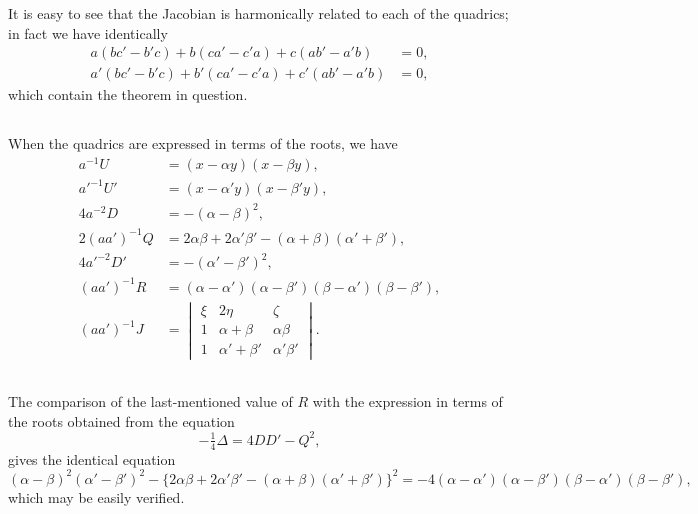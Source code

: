 \documentclass[11pt,a4paper]{book}
\begin{document}
\begin{center}
It is easy to see that the Jacobian is harmonically related to each of the quadrics; in fact we have identically
\begin{align*}
a(bc' - b'c) + b(ca' - c'a) + c(ab' - a'b) &= 0,\\
a'(bc' - b'c) + b'(ca' - c'a) + c'(ab' - a'b) &= 0,
\end{align*}
which contain the theorem in question.

\subsection{}

When the quadrics are expressed in terms of the roots, we have
\begin{align*}
a^{-1}U &= (x - \alpha y)(x - \beta y),\\
a'^{-1}U' &= (x - \alpha' y)(x - \beta' y),\\
4a^{-2}D &= -(\alpha - \beta)^2,\\
2(aa')^{-1}Q &= 2\alpha\beta + 2\alpha'\beta' - (\alpha + \beta)(\alpha' + \beta'),\\
4a'^{-2}D' &= -(\alpha' - \beta')^2,\\
(aa')^{-1}R &= (\alpha - \alpha')(\alpha - \beta')(\beta - \alpha')(\beta - \beta'),\\
(aa')^{-1}J &=
\begin{vmatrix}
\xi & 2\eta & \zeta \\
1 & \alpha + \beta & \alpha\beta \\
1 & \alpha' + \beta' & \alpha'\beta'
\end{vmatrix}.
\end{align*}

\subsection{}

The comparison of the last-mentioned value of $R$ with the expression in terms of the roots obtained from the equation
\[
-\tfrac{1}{4}\Delta = 4DD' - Q^2,
\]
gives the identical equation
\[
(\alpha - \beta)^2(\alpha' - \beta')^2 - \{2\alpha\beta + 2\alpha'\beta' - (\alpha + \beta)(\alpha' + \beta')\}^2 = -4(\alpha - \alpha')(\alpha - \beta')(\beta - \alpha')(\beta - \beta'),
\]
which may be easily verified.

\subsection{}


\end{center}
\end{document}
